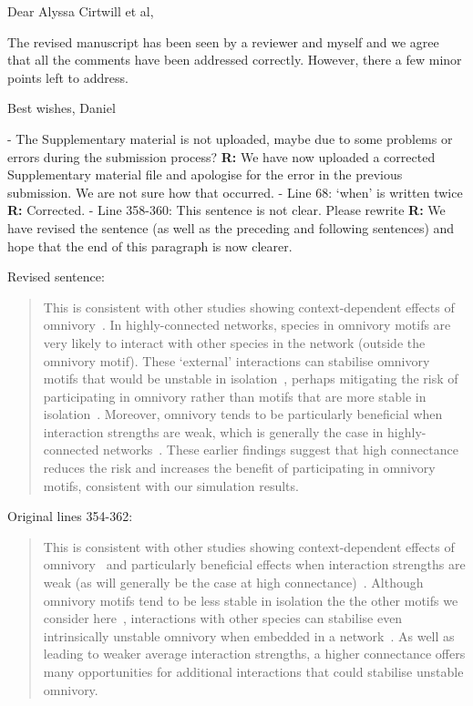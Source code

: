 \documentclass[12pt]{article}
\newenvironment{refquote}{\bigskip \begin{it}}{\end{it}\medskip}
\begin{document}
    \begin{refquote}
    Dear Alyssa Cirtwill et al,

    The revised manuscript has been seen by a reviewer and myself and we agree that all the comments have been addressed correctly. However, there a few minor points left to address.

    Best wishes,
    Daniel
    \end{refquote}

    - The Supplementary material is not uploaded, maybe due to some problems or errors during the submission process?
    \textbf{R:} We have now uploaded a corrected Supplementary material file and apologise for the error in the previous submission. We are not sure how that occurred.
    - Line 68: ‘when’ is written twice
    \textbf{R:} Corrected.
    - Line 358-360: This sentence is not clear. Please rewrite
    \textbf{R:} We have revised the sentence (as well as the preceding and following sentences) and hope that the end of this paragraph is now clearer.

    Revised sentence:
    \begin{quotation}
    This is consistent with other studies showing context-dependent effects of omnivory~\citep{Bascompte2005,Monteiro2016}.
    In highly-connected networks, species in omnivory motifs are very likely to interact with other species in the network (outside the omnivory motif).
    These `external' interactions can stabilise omnivory motifs that would be unstable in isolation~\citep{Kratina2012}, perhaps mitigating the risk of participating in omnivory rather than motifs that are more stable in isolation~\citep{Borelli2015}.
    Moreover, omnivory tends to be particularly beneficial when interaction strengths are weak, which is generally the case in highly-connected networks~\citep{Emmerson2004}.
    These earlier findings suggest that high connectance reduces the risk and increases the benefit of participating in omnivory motifs, consistent with our simulation results.

    \end{quotation}

    Original lines 354-362:

    \begin{quotation}
    This is consistent with other studies showing context-dependent effects of omnivory~\citep{Bascompte2005,Monteiro2016} and particularly beneficial effects when interaction strengths are weak (as will generally be the case at high connectance)~\citep{Emmerson2004}. Although omnivory motifs tend to be less stable in isolation the the other motifs we consider here~\citep{Borrelli2015}, interactions with other species can stabilise even intrinsically unstable omnivory when embedded in a network~\citep{Kratina2012}. As well as leading to weaker average interaction strengths, a higher connectance offers many opportunities for additional interactions that could stabilise unstable omnivory.
    \end{quotation}
\end{document}
